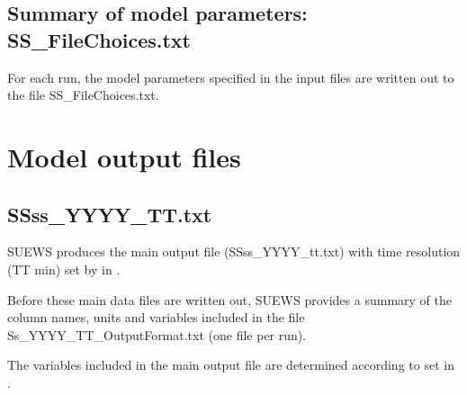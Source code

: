 \documentclass[letterpaper,10pt,english]{sphinxmanual}
\begin{document}
\subsection{Summary of model parameters: SS\_FileChoices.txt}
\label{\detokenize{output_files/output_files:summary-of-model-parameters-ss-filechoices-txt}}
For each run, the model parameters specified in the input files are
written out to the file SS\_FileChoices.txt.


\section{Model output files}
\label{\detokenize{output_files/output_files:model-output-files}}

\subsection{SSss\_YYYY\_TT.txt}
\label{\detokenize{output_files/output_files:ssss-yyyy-tt-txt}}
SUEWS produces the main output file (SSss\_YYYY\_tt.txt) with time
resolution (TT min) set by  in {\hyperref[\detokenize{input_files/RunControl/RunControl:runcontrol-nml}]{}}.

Before these main data files are written out, SUEWS provides a summary
of the column names, units and variables included in the file
Ss\_YYYY\_TT\_OutputFormat.txt (one file per run).

The variables included in the main output file are determined according
to {\hyperref[\detokenize{input_files/RunControl/File_related_options:cmdoption-arg-writeoutoption}]{}} set in {\hyperref[\detokenize{input_files/RunControl/RunControl:runcontrol-nml}]{}}.
\end{document}
